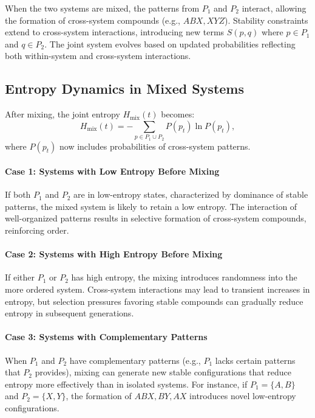 \documentclass[entropy,article,submit,pdftex,moreauthors]{Definitions/mdpi}
\begin{document}
When the two systems are mixed, the patterns from \( P_1 \) and \( P_2 \) interact, allowing the formation of cross-system compounds (e.g., \( ABX, XYZ \)). Stability constraints extend to cross-system interactions, introducing new terms \( S(p, q) \) where \( p \in P_1 \) and \( q \in P_2 \). The joint system evolves based on updated probabilities reflecting both within-system and cross-system interactions.

\subsection{Entropy Dynamics in Mixed Systems}

After mixing, the joint entropy \( H_{\text{mix}}(t) \) becomes:
\[
H_{\text{mix}}(t) = -\sum_{p \in P_1 \cup P_2} P(p_t) \ln P(p_t),
\]
where \( P(p_t) \) now includes probabilities of cross-system patterns.

\paragraph{Case 1: Systems with Low Entropy Before Mixing}
If both \( P_1 \) and \( P_2 \) are in low-entropy states, characterized by dominance of stable patterns, the mixed system is likely to retain a low entropy. The interaction of well-organized patterns results in selective formation of cross-system compounds, reinforcing order.

\paragraph{Case 2: Systems with High Entropy Before Mixing}
If either \( P_1 \) or \( P_2 \) has high entropy, the mixing introduces randomness into the more ordered system. Cross-system interactions may lead to transient increases in entropy, but selection pressures favoring stable compounds can gradually reduce entropy in subsequent generations.

\paragraph{Case 3: Systems with Complementary Patterns}
When \( P_1 \) and \( P_2 \) have complementary patterns (e.g., \( P_1 \) lacks certain patterns that \( P_2 \) provides), mixing can generate new stable configurations that reduce entropy more effectively than in isolated systems. For instance, if \( P_1 = \{A, B\} \) and \( P_2 = \{X, Y\} \), the formation of \( ABX, BY, AX \) introduces novel low-entropy configurations.
\end{document}
